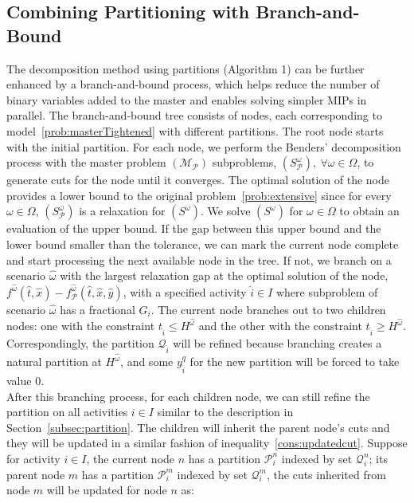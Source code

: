 \documentclass[11pt]{article}
\begin{document}
	\subsection{Combining Partitioning with Branch-and-Bound} \label{subsec:bbpartition}
	The decomposition method using partitions (Algorithm 1) can be further enhanced by a branch-and-bound process, which helps reduce the number of binary variables added to the master and enables solving simpler MIPs in parallel. The branch-and-bound tree consists of nodes, each corresponding to model~\eqref{prob:masterTightened} with different partitions. The root node starts with the initial partition. For each node, we perform the Benders' decomposition process with the master problem \((\mathcal{M}_{\mathcal{P}})\) subproblems, \((S_{\mathcal{P}}^\omega),\ \forall \omega \in \Omega\), to generate cuts for the node until it converges. The optimal solution of the node provides a lower bound to the original problem~\ref{prob:extensive} since for every \(\omega \in \Omega\), \((S_{\mathcal{P}}^\omega)\) is a relaxation for \((S^\omega)\). We solve \((S^\omega)\) for \(\omega \in \Omega\) to obtain an evaluation of the upper bound. If the gap between this upper bound and the lower bound smaller than the tolerance, we can mark the current node complete and start processing the next available node in the tree. If not, we branch on a scenario \(\hat{\omega}\) with the largest relaxation gap at the optimal solution of the node, \(f^{\hat{\omega}}(\hat{t},\hat{x}) - f^{\hat{\omega}}_{\mathcal{P}}(\hat{t},\hat{x},\hat{y})\), with a specified activity \(\hat{i} \in I\) where subproblem of scenario \(\hat{\omega}\) has a fractional \(G_i\). The current node branches out to two children nodes: one with the constraint \(t_{\hat{i}} \leq H^{\hat{\omega}}\) and the other with the constraint \(t_{\hat{i}} \geq H^{\hat{\omega}}\). Correspondingly, the partition \(\mathcal{Q}_{\hat{i}}\) will be refined because branching creates a natural partition at \(H^{\hat{\omega}}\), and some \(y_{\hat{i}}^{q}\) for the new partition will be forced to take value 0.\\
	\newline
	After this branching process, for each children node, we can still refine the partition on all activities \(i \in I\) similar to the description in Section~\ref{subsec:partition}. The children will inherit the parent node's cuts and they will be updated in a similar fashion of inequality~\eqref{cons:updatedcut}. Suppose for activity \(i \in I\), the current node \(n\) has a partition \(\mathcal{P}_i^n\) indexed by set \(\mathcal{Q}_i^n\); its parent node \(m\) has a partition \(\mathcal{P}_i^m\) indexed by set \(\mathcal{Q}_i^m\), the cuts inherited from node \(m\) will be updated for node \(n\) as:
\end{document}
